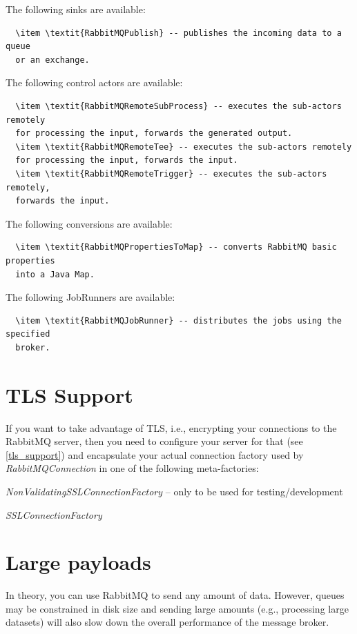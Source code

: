 \documentclass[a4paper]{book}
\begin{document}
The following sinks are available:
\begin{verbatim}
  \item \textit{RabbitMQPublish} -- publishes the incoming data to a queue
  or an exchange.
\end{verbatim}

The following control actors are available:
\begin{verbatim}
  \item \textit{RabbitMQRemoteSubProcess} -- executes the sub-actors remotely
  for processing the input, forwards the generated output.
  \item \textit{RabbitMQRemoteTee} -- executes the sub-actors remotely
  for processing the input, forwards the input.
  \item \textit{RabbitMQRemoteTrigger} -- executes the sub-actors remotely,
  forwards the input.
\end{verbatim}

The following conversions are available:
\begin{verbatim}
  \item \textit{RabbitMQPropertiesToMap} -- converts RabbitMQ basic properties
  into a Java Map.
\end{verbatim}

The following JobRunners are available:
\begin{verbatim}
  \item \textit{RabbitMQJobRunner} -- distributes the jobs using the specified
  broker.
\end{verbatim}

\section{TLS Support}
If you want to take advantage of TLS, i.e., encrypting your connections to
the RabbitMQ server, then you need to configure your server for that (see
\ref{tls_support}) and encapsulate your actual connection factory used by
\textit{RabbitMQConnection} in one of the following meta-factories:
\begin{tight_itemize}
  \item \textit{NonValidatingSSLConnectionFactory} -- only to be used for testing/development
  \item \textit{SSLConnectionFactory}
\end{tight_itemize}

\section{Large payloads}
In theory, you can use RabbitMQ to send any amount of data. However, queues
may be constrained in disk size and sending large amounts (e.g., processing
large datasets) will also slow down the overall performance of the message broker.
\end{document}

